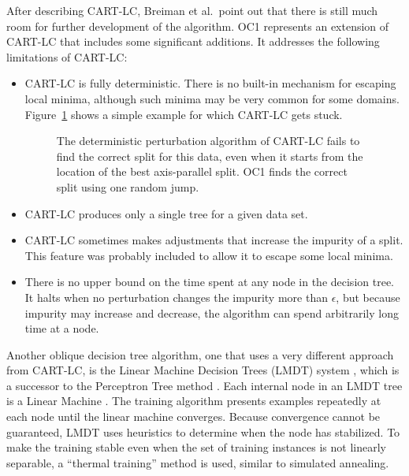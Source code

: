 After describing CART-LC, Breiman et al.\ point out that there is
still much room for further development of the algorithm.  OC1
represents an extension of CART-LC that includes some significant
additions.  It addresses the following limitations of CART-LC:
\begin{itemize}
\item CART-LC is fully deterministic. There is no built-in mechanism for
escaping local minima, although such minima may be very common for
some domains. Figure~\ref{figure:local-minimum} shows a simple
example for which CART-LC gets stuck.
\begin{figure}
\vspace{2.0in}
\caption{The deterministic perturbation algorithm of CART-LC fails to find 
the correct split for this data, even when it starts from the location of
the best axis-parallel split.  OC1 finds the correct split using one random 
jump.}
\label{figure:local-minimum}
\end{figure}
\item CART-LC produces only a single tree for a given data set.
\item CART-LC sometimes makes adjustments that increase the impurity
of a split.  This feature was probably included to allow it to escape
some local minima.
\item There is no upper bound on the time spent at any node in the
decision tree.  It halts when no perturbation changes the impurity
more than $\epsilon$, but because impurity may increase and decrease,
the algorithm can spend arbitrarily long time at a node.
\end{itemize}

Another oblique decision tree algorithm, one that uses a very
different approach from CART-LC, is the Linear Machine Decision Trees
(LMDT) system \cite{utgoff/brodley/91,brodley/utgoff/92}, which is a
successor to the Perceptron Tree method
\cite{utgoff/89b,utgoff/brodley/90}.  Each internal node in an LMDT 
tree is a Linear Machine \cite{nilsson/90}.  The training algorithm
presents examples repeatedly at each node until the linear machine
converges.  Because convergence cannot be guaranteed, LMDT uses
heuristics to determine when the node has stabilized.  To make the
training stable even when the set of training instances is not
linearly separable, a ``thermal training'' method \cite{frean/90} is
used, similar to simulated annealing.  

